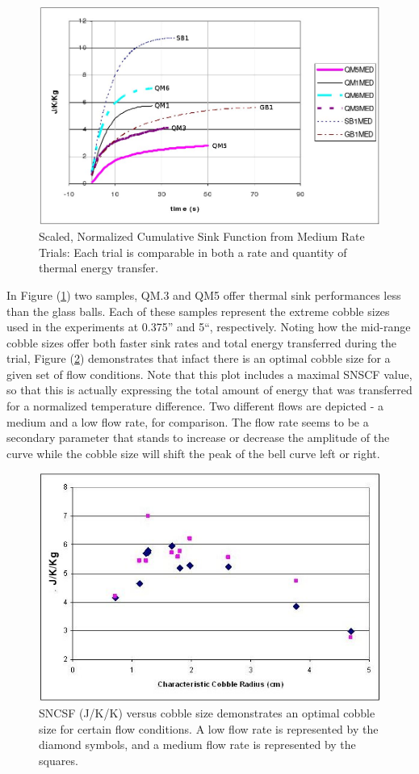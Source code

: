 \begin{figure}
 \label{med1}
 \centering\includegraphics[scale=0.6]{med1.JPG}
 \caption{Scaled, Normalized Cumulative Sink Function from Medium Rate Trials: Each trial is comparable in both a rate and quantity of thermal energy transfer.}
\end{figure}

In Figure (\ref{med1}) two samples, QM.3 and QM5 offer thermal sink performances less than the glass balls. Each of these samples represent the extreme cobble sizes used in the experiments at 0.375'' and 5``, respectively. Noting how the mid-range cobble sizes offer both faster sink rates and total energy transferred during the trial, Figure (\ref{opt1}) demonstrates that infact there is an optimal cobble size for a given set of flow conditions. Note that this plot includes a maximal SNSCF value, so that this is actually expressing the total amount of energy that was transferred for a normalized temperature difference. Two different flows are depicted - a medium and a low flow rate, for comparison. The flow rate seems to be a secondary parameter that stands to increase or decrease the amplitude of the curve while the cobble size will shift the peak of the bell curve left or right. 

\begin{figure}
 \label{opt1}
\centering\includegraphics[scale=0.6]{opt2.JPG}
 \caption{SNCSF (J/K/K) versus cobble size demonstrates an optimal cobble size for certain flow conditions. A low flow rate is represented by the diamond symbols, and a medium flow rate is represented by the squares.}
\end{figure}

